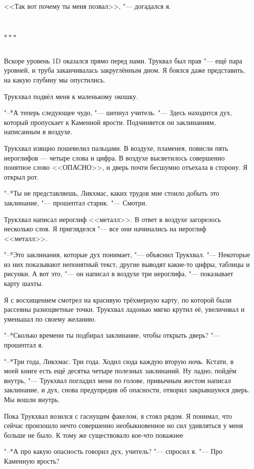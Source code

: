 \documentclass[a4paper,10pt]{book}
\newcommand{\ldotst}{\so{...}\xspace}
\newcommand{\razd}{~\\{\centering\Large\bfseries$\ast \ast \ast$\par}~\\}
\begin{document}
<<Так вот почему ты меня позвал>>, "--- догадался я.

\razd

Вскоре уровень 1D оказался прямо перед нами. Труквал был прав "--- ещё пара 
уровней, и труба заканчивалась закруглённым дном. Я боялся даже представить, на 
какую глубину мы опустились.

Трукхвал подвёл меня к маленькому окошку.

"--*А теперь следующее чудо, "--- шепнул учитель. "--- Здесь находится дух, 
который пропускает к Каменной ярости. Подчиняется он заклинаниям, написанным в 
воздухе.

Трукхвал изящно пошевелил пальцами. В воздухе, пламенея, повисли пять 
иероглифов --- четыре слова и цифра. В воздухе высветилось совершенно понятное 
слово <<ОПАСНО>>, и дверь почти бесшумно отъехала в сторону. Я открыл рот.

"--*Ты не представляешь, Ликхмас, каких трудов мне стоило добыть это 
заклинание, "--- прошептал старик. "--- Смотри.

Трукхвал написал иероглиф <<металл>>. В ответ в воздухе загорелось несколько 
слов. Я пригляделся "--- все они начинались на иероглиф <<металл>>.

"--*Это заклинания, которые дух понимает, "--- объяснил Трукхвал. "--- 
Некоторые из них показывают непонятный текст, другие выводят какие-то цифры, 
таблицы и рисунки. А вот это, "--- он написал в воздухе три иероглифа, "--- 
показывает карту шахты.

Я с восхищением смотрел на красивую трёхмерную карту, по которой были рассеяны 
разноцветные точки. Трукхвал ладонью мягко крутил её, увеличивал и уменьшал по 
своему желанию.

"--*Сколько времени ты подбирал заклинание, чтобы открыть дверь? "--- прошептал 
я.

"--*Три года, Ликхмас. Три года. Ходил сюда каждую вторую ночь. Кстати, в моей 
книге есть ещё десятка четыре полезных заклинаний. Ну ладно, пойдём внутрь, 
"--- Трукхвал погладил меня по голове, привычным жестом написал заклинание, и 
дух, снова предупредив об опасности, отворил закрывшуюся дверь. Мы вошли внутрь.

Пока Трукхвал возился с гаснущим факелом, я стоял рядом. Я понимал, что сейчас 
произошло нечто совершенно необыкновенное но сил удивляться у меня больше не 
было. К тому же существовало кое-что поважнее\ldotst

"--*А про какую опасность говорил дух, учитель? "--- спросил я. "--- Про 
Каменную ярость?
\end{document}
